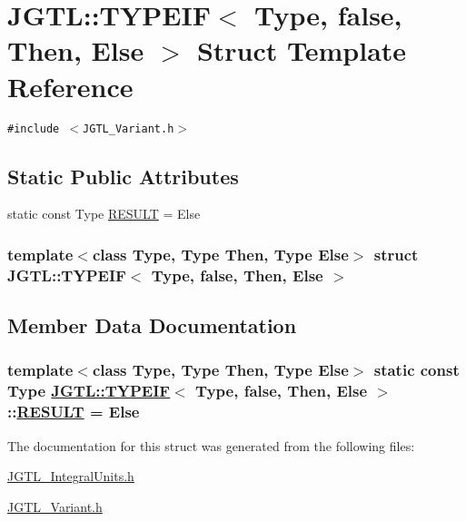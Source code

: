 \hypertarget{struct_j_g_t_l_1_1_t_y_p_e_i_f_3_01_type_00_01false_00_01_then_00_01_else_01_4}{
\section{JGTL::TYPEIF$<$ Type, false, Then, Else $>$ Struct Template Reference}
\label{struct_j_g_t_l_1_1_t_y_p_e_i_f_3_01_type_00_01false_00_01_then_00_01_else_01_4}
}
{\tt \#include $<$JGTL\_\-Variant.h$>$}

\subsection*{Static Public Attributes}
\begin{CompactItemize}
\item 
static const Type \hyperlink{struct_j_g_t_l_1_1_t_y_p_e_i_f_3_01_type_00_01false_00_01_then_00_01_else_01_4_f9e27c1fb6187236d748543b4f0e742b}{RESULT} = Else
\end{CompactItemize}
\subsubsection*{template$<$class Type, Type Then, Type Else$>$ struct JGTL::TYPEIF$<$ Type, false, Then, Else $>$}



\subsection{Member Data Documentation}
\hypertarget{struct_j_g_t_l_1_1_t_y_p_e_i_f_3_01_type_00_01false_00_01_then_00_01_else_01_4_f9e27c1fb6187236d748543b4f0e742b}{
\subsubsection[RESULT]{\setlength{\rightskip}{0pt plus 5cm}template$<$class Type, Type Then, Type Else$>$ static const Type \hyperlink{struct_j_g_t_l_1_1_t_y_p_e_i_f}{JGTL::TYPEIF}$<$ Type, false, Then, Else $>$::\hyperlink{struct_j_g_t_l_1_1_t_y_p_e_i_f_3_01_type_00_01false_00_01_then_00_01_else_01_4_f9e27c1fb6187236d748543b4f0e742b}{RESULT} = Else}}
\label{struct_j_g_t_l_1_1_t_y_p_e_i_f_3_01_type_00_01false_00_01_then_00_01_else_01_4_f9e27c1fb6187236d748543b4f0e742b}




The documentation for this struct was generated from the following files:\begin{CompactItemize}
\item 
\hyperlink{_j_g_t_l___integral_units_8h}{JGTL\_\-Integral\-Units.h}\item 
\hyperlink{_j_g_t_l___variant_8h}{JGTL\_\-Variant.h}\end{CompactItemize}
